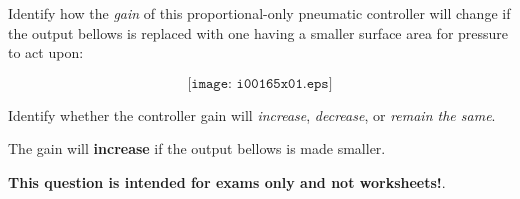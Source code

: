 

Identify how the {\it gain} of this proportional-only pneumatic controller will change if the output bellows is replaced with one having a smaller surface area for pressure to act upon:

$$\texttt{[image: i00165x01.eps]}$$

Identify whether the controller gain will {\it increase}, {\it decrease}, or {\it remain the same}.

\vskip 30pt







The gain will {\bf increase} if the output bellows is made smaller.







{\bf This question is intended for exams only and not worksheets!}.



